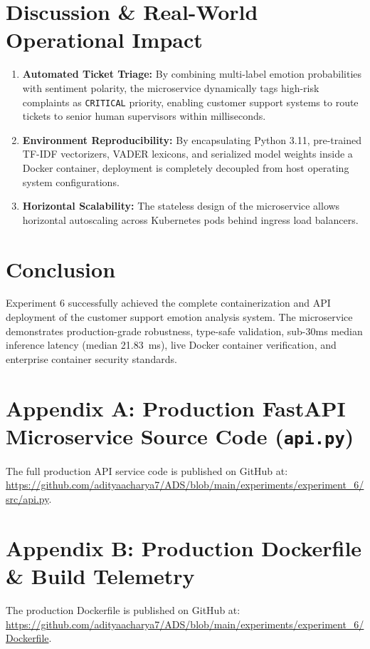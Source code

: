 \documentclass[11pt, a4paper]{article}
\begin{document}
\section{Discussion \& Real-World Operational Impact}
\begin{enumerate}[leftmargin=1.5em]
    \item \textbf{Automated Ticket Triage:} By combining multi-label emotion probabilities with sentiment polarity, the microservice dynamically tags high-risk complaints as \texttt{CRITICAL} priority, enabling customer support systems to route tickets to senior human supervisors within milliseconds.
    \item \textbf{Environment Reproducibility:} By encapsulating Python 3.11, pre-trained TF-IDF vectorizers, VADER lexicons, and serialized model weights inside a Docker container, deployment is completely decoupled from host operating system configurations.
    \item \textbf{Horizontal Scalability:} The stateless design of the microservice allows horizontal autoscaling across Kubernetes pods behind ingress load balancers.
\end{enumerate}

\section{Conclusion}
Experiment 6 successfully achieved the complete containerization and API deployment of the customer support emotion analysis system. The microservice demonstrates production-grade robustness, type-safe validation, sub-30ms median inference latency (median 21.83~ms), live Docker container verification, and enterprise container security standards.

\section*{Appendix A: Production FastAPI Microservice Source Code (\texttt{api.py})}
The full production API service code is published on GitHub at: \\
\url{https://github.com/adityaacharya7/ADS/blob/main/experiments/experiment_6/src/api.py}.


\section*{Appendix B: Production Dockerfile \& Build Telemetry}
The production Dockerfile is published on GitHub at: \\
\url{https://github.com/adityaacharya7/ADS/blob/main/experiments/experiment_6/Dockerfile}.

\end{document}
